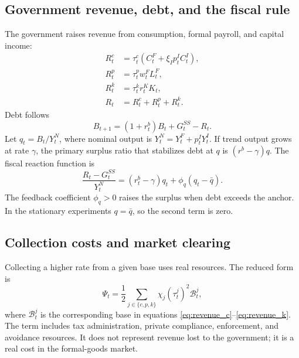 \documentclass[12pt]{article}
\begin{document}
\subsection{Government revenue, debt, and the fiscal rule}

The government raises revenue from consumption, formal payroll, and capital
income:
\begin{align}
 R_t^c&=\tau_t^c
   \left(C_t^F+\xi_Ip_t^IC_t^I\right),                       \label{eq:revenue_c}\\
 R_t^p&=\tau_t^p w_t^F L_t^F,                               \label{eq:revenue_p}\\
 R_t^k&=\tau_t^k r_t^K K_t,                                 \label{eq:revenue_k}\\
 R_t&=R_t^c+R_t^p+R_t^k.                                    \label{eq:revenue_total}
\end{align}
Debt follows
\begin{equation}
 B_{t+1}=(1+r_t^b)B_t+G_t^{SS}-R_t.
 \label{eq:government_budget}
\end{equation}
Let $q_t=B_t/Y_t^N$, where nominal output is
$Y_t^N=Y_t^F+p_t^IY_t^I$. If trend output grows at rate $\gamma$, the primary
surplus ratio that stabilizes debt at $q$ is $(r^b-\gamma)q$. The fiscal
reaction function is
\begin{equation}
 \frac{R_t-G_t^{SS}}{Y_t^N}
 =
 (r_t^b-\gamma)q_t
 +\phi_q(q_t-\bar q).
 \label{eq:fiscal_rule}
\end{equation}
The feedback coefficient $\phi_q>0$ raises the surplus when debt exceeds the
anchor. In the stationary experiments $q=\bar q$, so the second term is zero.

\subsection{Collection costs and market clearing}

Collecting a higher rate from a given base uses real resources. The reduced
form is
\begin{equation}
 \Psi_t=
 \frac{1}{2}\sum_{j\in\{c,p,k\}}
 \chi_j(\tau_t^j)^2\mathcal B_t^j,
 \label{eq:collection_cost}
\end{equation}
where $\mathcal B_t^j$ is the corresponding base in
equations \eqref{eq:revenue_c}--\eqref{eq:revenue_k}. The term includes tax
administration, private compliance, enforcement, and avoidance resources. It
does not represent revenue lost to the government; it is a real cost in the
formal-goods market.
\end{document}
